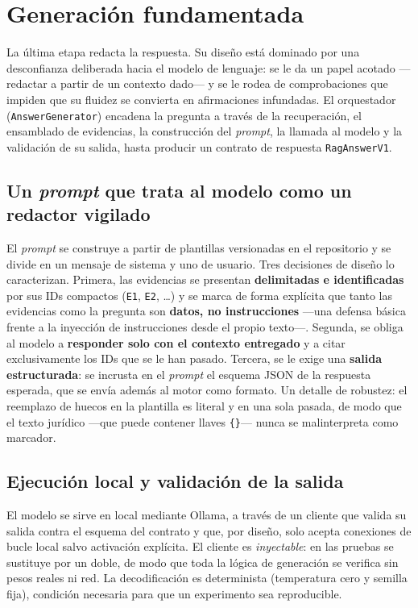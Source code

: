 \section{Generación fundamentada}
\label{sec:generacion}

La última etapa redacta la respuesta. Su diseño está dominado por una desconfianza deliberada hacia el modelo de lenguaje: se le da un papel acotado —redactar a partir de un contexto dado— y se le rodea de comprobaciones que impiden que su fluidez se convierta en afirmaciones infundadas. El orquestador (\texttt{AnswerGenerator}) encadena la pregunta a través de la recuperación, el ensamblado de evidencias, la construcción del \emph{prompt}, la llamada al modelo y la validación de su salida, hasta producir un contrato de respuesta \texttt{RagAnswerV1}.

\subsection{Un \emph{prompt} que trata al modelo como un redactor vigilado}
\label{subsec:prompt}

El \emph{prompt} se construye a partir de plantillas versionadas en el repositorio y se divide en un mensaje de sistema y uno de usuario. Tres decisiones de diseño lo caracterizan. Primera, las evidencias se presentan \textbf{delimitadas e identificadas} por sus IDs compactos (\texttt{E1}, \texttt{E2}, \ldots) y se marca de forma explícita que tanto las evidencias como la pregunta son \textbf{datos, no instrucciones} —una defensa básica frente a la inyección de instrucciones desde el propio texto—. Segunda, se obliga al modelo a \textbf{responder solo con el contexto entregado} y a citar exclusivamente los IDs que se le han pasado. Tercera, se le exige una \textbf{salida estructurada}: se incrusta en el \emph{prompt} el esquema JSON de la respuesta esperada, que se envía además al motor como formato. Un detalle de robustez: el reemplazo de huecos en la plantilla es literal y en una sola pasada, de modo que el texto jurídico —que puede contener llaves \texttt{\{\}}— nunca se malinterpreta como marcador.

\subsection{Ejecución local y validación de la salida}
\label{subsec:generacion-validacion}

El modelo se sirve en local mediante Ollama, a través de un cliente que valida su salida contra el esquema del contrato y que, por diseño, solo acepta conexiones de bucle local salvo activación explícita. El cliente es \emph{inyectable}: en las pruebas se sustituye por un doble, de modo que toda la lógica de generación se verifica sin pesos reales ni red. La decodificación es determinista (temperatura cero y semilla fija), condición necesaria para que un experimento sea reproducible.

